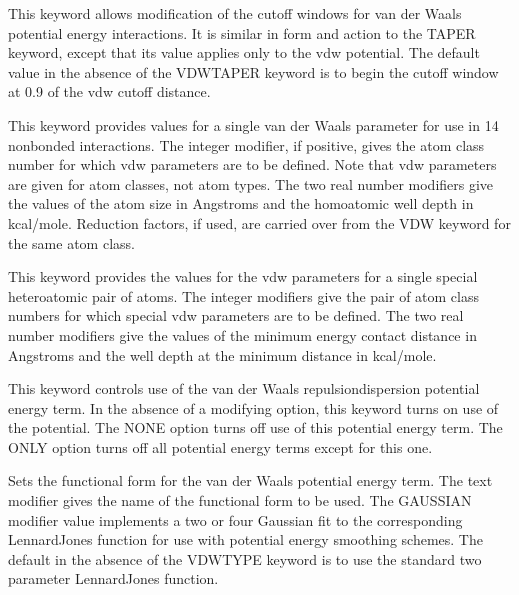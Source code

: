 \documentclass[letterpaper,11pt,english]{sphinxmanual}
\begin{document}

  This keyword allows modification of the cutoff windows for van der Waals potential energy interactions. It is similar in form and action to the TAPER keyword, except that its value applies only to the vdw potential. The default value in the absence of the VDW\sphinxhyphen{}TAPER keyword is to begin the cutoff window at 0.9 of the vdw cutoff distance.

  This keyword provides values for a single van der Waals parameter for use in 1\sphinxhyphen{}4 nonbonded interactions. The integer modifier, if positive, gives the atom class number for which vdw parameters are to be defined. Note that vdw parameters are given for atom classes, not atom types. The two real number modifiers give the values of the atom size in Angstroms and the homoatomic well depth in kcal/mole. Reduction factors, if used, are carried over from the VDW keyword for the same atom class.


  This keyword provides the values for the vdw parameters for a single special heteroatomic pair of atoms. The integer modifiers give the pair of atom class numbers for which special vdw parameters are to be defined. The two real number modifiers give the values of the minimum energy contact distance in Angstroms and the well depth at the minimum distance in kcal/mole.

  This keyword controls use of the van der Waals repulsion\sphinxhyphen{}dispersion potential energy term. In the absence of a modifying option, this keyword turns on use of the potential. The NONE option turns off use of this potential energy term. The ONLY option turns off all potential energy terms except for this one.

  Sets the functional form for the van der Waals potential energy term. The text modifier gives the name of the functional form to be used. The GAUSSIAN modifier value implements a two or four Gaussian fit to the corresponding Lennard\sphinxhyphen{}Jones function for use with potential energy smoothing schemes. The default in the absence of the VDWTYPE keyword is to use the standard two parameter Lennard\sphinxhyphen{}Jones function.
\end{document}
